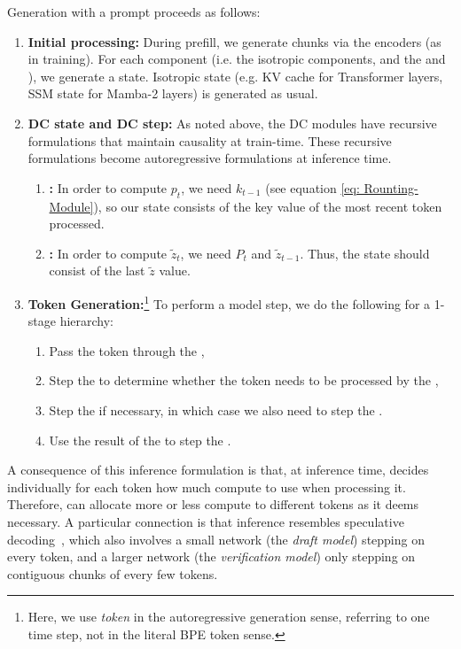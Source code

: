Generation with a prompt proceeds as follows:
\begin{enumerate}
    \item \textbf{Initial processing:} During prefill, we generate chunks via the encoders (as in training). For each component (i.e. the isotropic components, and the \router{} and \dechunk{}), we generate a state.  Isotropic state (e.g. KV cache for Transformer layers, SSM state for Mamba-2 layers) is generated as usual.
    \item \textbf{DC state and DC step:} As noted above, the DC modules have recursive formulations that maintain causality at train-time. These recursive formulations become autoregressive formulations at inference time.
    \begin{enumerate}
        \item \textbf{\ROUTER{}:} In order to compute $p_t$, we need $k_{t-1}$ (see equation \eqref{eq: Rounting-Module}), so our state consists of the key value of the most recent token processed.
        \item \textbf{\DECHUNK{}:} In order to compute $\tilde z_t$, we need $P_t$ and $\tilde z_{t-1}$. Thus, the \dechunk{} state should consist of the last $\tilde z$ value.
    \end{enumerate}
    \item \textbf{Token Generation:}\footnote{Here, we use \emph{token} in the autoregressive generation sense, referring to one time step, not in the literal BPE token sense.} To perform a model step, we do the following for a 1-stage hierarchy:
    \begin{enumerate}
        \item Pass the token through the \encoder{},
        \item Step the \router{} to determine whether the token needs to be processed by the \main{},
        \item Step the \main{} if necessary, in which case we also need to step the \dechunk{}.
        \item Use the result of the \dechunk{} to step the \decoder{}.
    \end{enumerate}
\end{enumerate}

A consequence of this inference formulation is that, at inference time, \model{} decides individually for each token how much compute to use when processing it.
Therefore, \model{} can allocate more or less compute to different tokens as it deems necessary.
A particular connection is that inference resembles speculative decoding~\citep{SpeculativeDecoding, SpeculativeSampling},
which also involves a small network (the \emph{draft model}) stepping on every token, and a larger network (the \emph{verification model}) only stepping on contiguous chunks of every few tokens.



